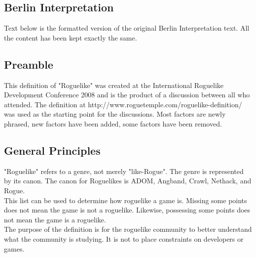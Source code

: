 \documentclass{article}
\begin{document}
\subsection{Berlin Interpretation}

Text below is the formatted version of the original Berlin Interpretation text. All the content has been kept exactly the same.

\subsection*{Preamble}

This definition of "Roguelike" was created at the International 
Roguelike Development Conference 2008 and is the product of a 
discussion between all who attended. The definition at 
http://www.roguetemple.com/roguelike-definition/ was used as the 
starting point for the discussions. Most factors are newly phrased, 
new factors have been added, some factors have been removed.

\subsection*{General Principles}
 
"Roguelike" refers to a genre, not merely "like-Rogue". The genre is 
represented by its canon. The canon for Roguelikes is ADOM, Angband, 
Crawl, Nethack, and Rogue.\\
 
This list can be used to determine how roguelike a game is. Missing 
some points does not mean the game is not a roguelike. Likewise, 
possessing some points does not mean the game is a roguelike.\\  
 
The purpose of the definition is for the roguelike community to better 
understand what the community is studying. It is not to place 
constraints on developers or games.\\
\end{document}
